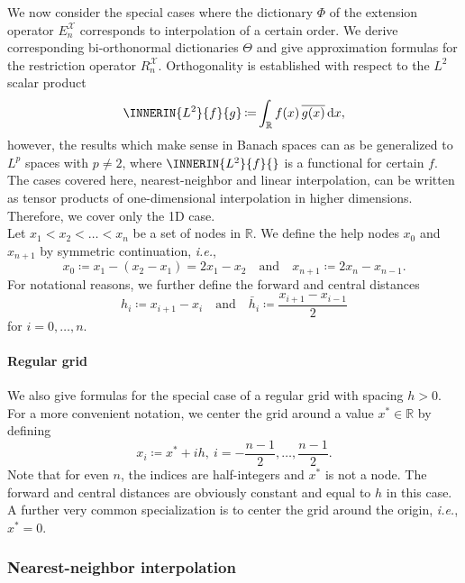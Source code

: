 \documentclass[a4paper]{paper}
\newcommand*{\SPC}[1]{{\ensuremath{\mathscr{#1}}}}
\newcommand{\RR}{{\ensuremath{\mathbb{R}}}}
\newcommand*{\EXT}[2]{\ensuremath{E_{#1}^{#2}}}
\newcommand*{\REST}[2]{\ensuremath{R_{#1}^{#2}}}
\newcommand*{\RnX}{{\ensuremath{\REST{n}{\SPC{X}}}}}
\newcommand*{\EnX}{{\ensuremath{\EXT{n}{\SPC{X}}}}}
\DeclareMathOperator{\DEFEQ}{{\coloneqq}}
\newcommand*{\CCONJ}[1]{{\ensuremath{\overline{#1}}}}
\newcommand*{\D}{{\ensuremath{\mathrm{d}}}}
\newcommand*{\ie}{\textsl{i.e.}\xspace}
\begin{document}
We now consider the special cases where the dictionary $\Phi$ of the extension operator $\EnX$ corresponds to 
interpolation of a certain order. We derive corresponding bi-orthonormal dictionaries $\Theta$ and give approximation 
formulas for the restriction operator $\RnX$. Orthogonality is established with respect to the $L^2$ scalar product
%
\begin{equation*}
 \INNERIN{L^2}{f}{g} \DEFEQ \int_\RR f(x)\, \CCONJ{g(x)}\, \D x,
\end{equation*}
%
however, the results which make sense in Banach spaces can as be generalized to $L^p$ spaces with $p \neq 2$, where 
$\INNERIN{L^2}{f}{}$ is a functional for certain $f$. The cases covered here, nearest-neighbor and linear 
interpolation, 
can be written as tensor products of one-dimensional interpolation in higher dimensions. Therefore, we cover only the 
1D 
case. \\
%
Let $x_1 < x_2 < \dots < x_n$ be a set of nodes in $\RR$. We define the help nodes $x_0$ 
and $x_{n+1}$ by symmetric continuation, \ie,
%
\begin{equation*}
 x_0 \DEFEQ x_1 - (x_2 - x_1) = 2 x_1 - x_2
 \quad \text{and} \quad
 x_{n+1} \DEFEQ  2 x_n - x_{n-1}.
\end{equation*}
%
For notational reasons, we further define the forward and central distances
%
\begin{equation*}
 h_i \DEFEQ x_{i+1} - x_i
 \quad\text{and}\quad
 \bar h_i \DEFEQ \frac{x_{i+1} - x_{i-1}}{2}
\end{equation*}
%
for $i=0,\dots,n$.

\paragraph{Regular grid}

We also give formulas for the special case of a regular grid with spacing $h>0$. For a more convenient notation, we 
center the grid around a value $x^*\in\RR$ by defining
%
\begin{equation*}
 x_i \DEFEQ x^* + ih,\ i = -\frac{n-1}{2}, \dots, \frac{n-1}{2}.
\end{equation*}
%
Note that for even $n$, the indices are half-integers and $x^*$ is not a node. The forward and central distances are 
obviously constant and equal to $h$ in this case. A further very common specialization is to center the grid around the 
origin, \ie, $x^*=0$.



\subsubsection{Nearest-neighbor interpolation}
\label{subsubsec:specif:interp:nn}
\end{document}
